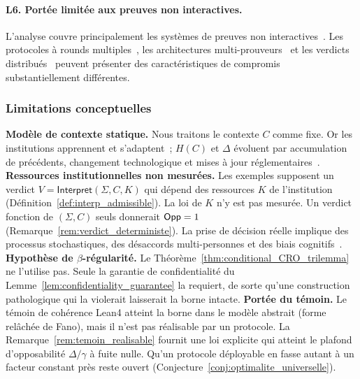 \begin{sloppypar}
\paragraph{L6. Port\'ee limit\'ee aux preuves non interactives.}
L'analyse couvre principalement les syst\`emes de preuves non
interactives~\cite{Groth16,BCTV14}. Les protocoles \`a rounds
multiples~\cite{Goldreich1987}, les architectures
multi-prouveurs~\cite{CramerDamgardSchoenmakers} et les verdicts
distribu\'es~\cite{Evans2018} peuvent pr\'esenter des caract\'eristiques
de compromis substantiellement diff\'erentes.

\subsubsection{Limitations conceptuelles}
\label{subsubsec:limitations_conceptuelles}

\textbf{Mod\`ele de contexte statique.} Nous traitons le contexte $C$
comme fixe. Or les institutions apprennent et s'adaptent~; $H(C)$ et
$\Delta$ \'evoluent par accumulation de pr\'ec\'edents, changement
technologique et mises \`a jour r\'eglementaires~\cite{Simon82}.
\textbf{Ressources institutionnelles non mesur\'ees.} Les exemples supposent un verdict
$V = \mathsf{Interpret}(\Sigma, C, K)$ qui d\'epend des ressources $K$ de l'institution
(D\'efinition~\ref{def:interp_admissible}). La loi de $K$ n'y est pas mesur\'ee. Un verdict fonction
de $(\Sigma, C)$ seuls donnerait $\mathsf{Opp} = 1$ (Remarque~\ref{rem:verdict_deterministe}). La prise de d\'ecision r\'eelle
implique des processus stochastiques, des d\'esaccords multi-personnes et
des biais cognitifs~\cite{Casey10,Kahneman11}. \textbf{Hypoth\`ese de
$\beta$-r\'egularit\'e.} Le Th\'eor\`eme~\ref{thm:conditional_CRO_trilemma}
ne l'utilise pas. Seule la garantie de confidentialit\'e du Lemme~\ref{lem:confidentiality_guarantee}
la requiert, de sorte qu'une construction pathologique qui la violerait laisserait la borne intacte. \textbf{Port\'ee du t\'emoin.} Le t\'emoin de coh\'erence Lean4
atteint la borne dans le mod\`ele abstrait (forme rel\^ach\'ee de Fano), mais il
n'est pas r\'ealisable par un protocole. La Remarque~\ref{rem:temoin_realisable} fournit une loi explicite
qui atteint le plafond d'opposabilit\'e $\Delta/\gamma$ \`a fuite nulle. Qu'un protocole d\'eployable en
fasse autant \`a un facteur constant pr\`es reste ouvert (Conjecture~\ref{conj:optimalite_universelle}).
\end{sloppypar}

